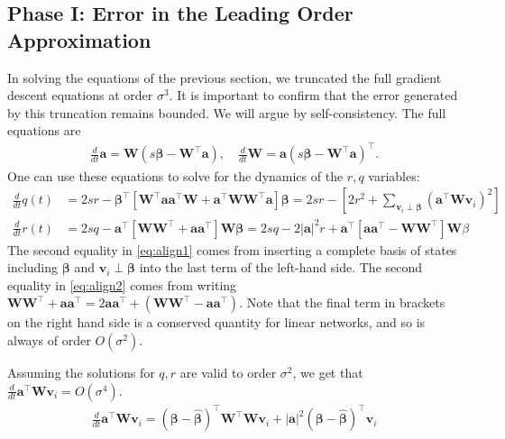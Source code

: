 \documentclass{article} %
\def\W{\bm W}
\begin{document}
\begin{appendix}
\subsection{Phase I: Error in the Leading Order Approximation}\label{sec:phase_one_error}

In solving the equations of the previous section, we truncated the full gradient descent equations at order $\sigma^3$. It is important to confirm that the error generated by this truncation remains bounded. We will argue by self-consistency. The full equations are
\begin{align}
    \frac{d}{dt} \bm a =  \bm W \left( s \bm\beta - \bm W^\top \bm a \right), \quad
    \frac{d}{dt} \W =  \bm a \left( s \bm \beta - \bm W^\top  \bm a  \right)^\top.
\end{align}
One can use these equations to solve for the dynamics of the $r, q$ variables:
    \begin{align}
    \frac{d}{dt} q(t) &= 2 s r - \bm \beta^\top \left[\bm W^\top \bm a \bm a^\top \bm W + \bm a^\top \bm W \bm W^\top \bm a \right] \bm \beta = 2 s r - [2 r^2 + \sum_{\bm v_i \perp \bm \beta}  (\bm a^\top \bm W \bm v_i)^2 ] \label{eq:align1} \\
    \frac{d}{dt} r(t) &= 2 s q - \bm a^\top [ \bm W \bm W^\top + \bm a \bm a^\top] \bm W \bm \beta = 2 s q - 2 |\bm a|^2 r + \bm a^\top [\bm a \bm a^\top - \bm W \bm W^\top] \bm W \beta\label{eq:align2}
    \end{align}
The second equality in \eqref{eq:align1} comes from inserting a complete basis of states including $\bm \beta$ and $\bm v_i \perp \bm \beta$ into the last term of the left-hand side. The second equality in \eqref{eq:align2} comes from writing $\bm W \bm W^\top + \bm a \bm a^\top = 2 \bm a \bm a^\top + (\bm W \bm W^\top - \bm a \bm a^\top)$. Note that the final term in brackets on the right hand side is a conserved quantity for linear networks, and so is always of order $O(\sigma^2)$.

Assuming the solutions for $q, r$ are valid to order $\sigma^2$, we get that $\frac{d}{dt} \bm a^\top \bm W \bm v_i = O(\sigma^4)$.
\begin{align}
    \frac{d}{dt} \bm a^\top \bm W \bm v_i = (\bm\beta-\hat{\bm\beta})^\top \bm W^\top \bm W \bm v_i + |\bm a|^2 (\bm\beta - \bm{\hat \beta})^\top \bm v_i 
\end{align}


\end{appendix}
\end{document}
